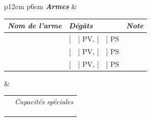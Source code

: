 \documentclass[11pt,twoside,a4paper]{article}
\begin{document}
{\scriptsize %
\begin{tabular}[h]{ p{12cm} p{6cm} }
	\textbf{\emph{Armes}} &  \\
	\begin{tabular}[h]{|p{5.0cm}|p{2.5cm}|p{4.5cm}|}
		\hline
			{\centering \emph{Nom de l'arme} }	&
			{\centering \emph{D{\'e}g{\^a}ts} }	&
			{\centering \emph{Note} }			\\
		\hline
			\dotfill & 
			[~~] PV, [~~] PS				& 
			\dotfill	\\
		\hline
			\dotfill	& 
			[~~] PV, [~~] PS				& 
			\dotfill	\\
		\hline
			\dotfill	& 
			[~~] PV, [~~] PS				& 
			\dotfill	\\
		\hline
	\end{tabular}
	& 
	\begin{tabular}[h]{ p{1.0cm}|p{5.0cm}|}
		\cline{2-2}
		 & \emph{Capacit{\'e}s sp{\'e}ciales}		\\
		\cline{2-2}
		 & \dotfill		\\
		\cline{2-2}
		 & \dotfill		\\
		\cline{2-2}
		 & \dotfill		\\
		\cline{2-2}
	\end{tabular}
	\\
\end{tabular} }
\end{document}
